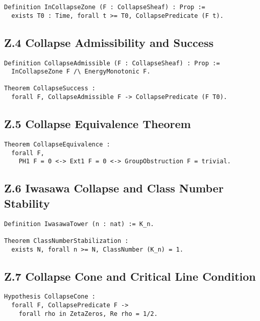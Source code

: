 \documentclass[11pt]{article}
\begin{document}
\begin{lstlisting}[language=Coq, caption=Collapse Zone Inclusion, captionpos=b]
Definition InCollapseZone (F : CollapseSheaf) : Prop :=
  exists T0 : Time, forall t >= T0, CollapsePredicate (F t).
\end{lstlisting}

\subsection*{Z.4 Collapse Admissibility and Success}

\begin{lstlisting}[language=Coq, caption=Admissibility and Success, captionpos=b]
Definition CollapseAdmissible (F : CollapseSheaf) : Prop :=
  InCollapseZone F /\ EnergyMonotonic F.

Theorem CollapseSuccess :
  forall F, CollapseAdmissible F -> CollapsePredicate (F T0).
\end{lstlisting}

\subsection*{Z.5 Collapse Equivalence Theorem}

\begin{lstlisting}[language=Coq, caption=Collapse Equivalence, captionpos=b]
Theorem CollapseEquivalence :
  forall F,
    PH1 F = 0 <-> Ext1 F = 0 <-> GroupObstruction F = trivial.
\end{lstlisting}

\subsection*{Z.6 Iwasawa Collapse and Class Number Stability}

\begin{lstlisting}[language=Coq, caption=Iwasawa Collapse, captionpos=b]
Definition IwasawaTower (n : nat) := K_n.

Theorem ClassNumberStabilization :
  exists N, forall n >= N, ClassNumber (K_n) = 1.
\end{lstlisting}

\subsection*{Z.7 Collapse Cone and Critical Line Condition}

\begin{lstlisting}[language=Coq, caption=Spectral Collapse and RH Constraint, captionpos=b]
Hypothesis CollapseCone : 
  forall F, CollapsePredicate F -> 
    forall rho in ZetaZeros, Re rho = 1/2.
\end{lstlisting}
\end{document}
